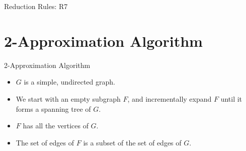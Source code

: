 \documentclass{beamer}
\begin{document}
\begin{frame}{Reduction Rules: R7}
\end{frame}

\section{2-Approximation Algorithm}


\begin{frame}{2-Approximation Algorithm}
\bigskip
\begin{itemize}[<+->]
    \item $G$ is a simple, undirected graph.
    \item We start with an empty subgraph $F$, and incrementally expand $F$ until it forms a spanning tree of $G$.
    \item $F$ has all the vertices of $G$.
    \item The set of edges of $F$ is a subset of the set of edges of $G$.
\end{itemize}
\end{frame}
\end{document}
